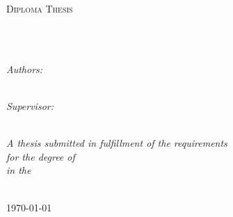 \documentclass[
11pt, %
english, %
singlespacing, %
parskip, %
headsepline, %
]{MastersDoctoralThesis} %
\author{\mbox{Konsantinos \textsc{Andrikopoulos}}, Dimitrios \textsc{Kolotouros}} %
\begin{document}
\frontmatter %

\pagestyle{plain} %


\begin{titlepage}
\begin{center}

{\scshape\LARGE \univname\par}\vspace{1.5cm} %
\textsc{\Large Diploma Thesis}\\[0.5cm] %

\HRule \\[0.4cm] %
{\huge \bfseries \ttitle\par}\vspace{0.4cm} %
\HRule \\[1.5cm] %

\begin{minipage}[t]{0.49\textwidth}
\begin{flushleft} \large
\emph{Authors:}\\
\href{http://www.johnsmith.com}{\authorname} \\ %
\end{flushleft}
\end{minipage}
\begin{minipage}[t]{0.49\textwidth}
\begin{flushright} \large
\emph{Supervisor:} \\
\href{http://www.jamessmith.com}{\supname} %
\end{flushright}
\end{minipage}\\[3cm]

\large \textit{A thesis submitted in fulfillment of the requirements\\ for the degree of \degreename}\\[0.3cm] %
\textit{in the}\\[0.4cm]
\deptname\\[2cm] %

\vfill

{\large \today}\\[4cm] %

\vfill
\end{center}
\end{titlepage}
\end{document}
